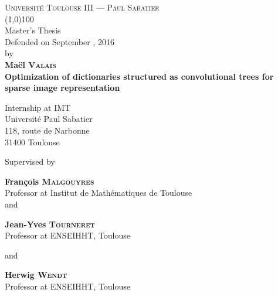\begin{titlepage}
\thispagestyle{titlepage}
\begin{center}
\textsc{Université Toulouse III — Paul Sabatier}\\
\vspace{0.5 cm}
\line(1,0){100}\\
\vspace{0.6 cm}
{{{Master's Thesis}}}\\
\vspace{0.3cm}
Defended on September , 2016\\ \vspace{0.3 cm} by\\ \vspace{0.3 cm} \textbf{Maël \textsc{Valais}}\\
\vfill
{\Huge \textbf{Optimization of dictionaries structured as convolutional trees for sparse image representation }}\\
\vfill

{{Internship at \acs{IMT}}}\\
{Université Paul Sabatier}\\
{118, route de Narbonne}\\
{31400 Toulouse}\\
\vspace{2 cm}

\par Supervised by
\vspace{0.5cm}
\par \textbf{François \textsc{Malgouyres}}\\
Professor at Institut de Mathématiques de Toulouse\\ 

\vspace{0.2cm} and \vspace{0.2cm}

\textbf{Jean-Yves \textsc{Tourneret}}\\
Professor at ENSEIHHT, Toulouse

\vspace{0.2cm} and \vspace{0.2cm}

\textbf{Herwig \textsc{Wendt}}\\
Professor at ENSEIHHT, Toulouse

\vspace{1.5cm}
\end{center}
\end{titlepage}

\pagestyle{empty}
\restoregeometry

\tableofcontents


\pagestyle{body}